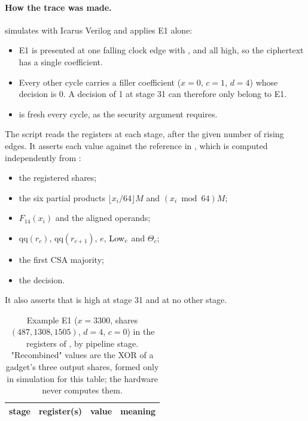 \paragraph{How the trace was made.}  simulates  with Icarus Verilog and applies E1 alone:
\begin{itemize}
  \item E1 is presented at one falling clock edge with ,  and  all high, so the ciphertext has a single coefficient.
  \item Every other cycle carries a filler coefficient ($x = 0$, $c = 1$, $d = 4$) whose decision is 0. A decision of 1 at stage 31 can therefore only belong to E1.
  \item {} is fresh every cycle, as the security argument requires.
\end{itemize}
The script reads the registers at each stage, after the given number of rising edges. It asserts each value against the reference in , which is computed independently from :
\begin{itemize}
  \item the registered shares;
  \item the six partial products $\lfloor x_i/64 \rfloor M$ and $(x_i \bmod 64) M$;
  \item $F_{14}(x_i)$ and the aligned operands;
  \item $\mathrm{qq}(r_c)$, $\mathrm{qq}(r_{c+1})$, $e$, $\mathrm{Low}_c$ and $\Theta_c$;
  \item the first CSA majority;
  \item the decision.
\end{itemize}
It also asserts that  is high at stage 31 and at no other stage.

\begin{table}[h]\centering\small
\caption{Example E1 ($x = 3300$, shares $(487, 1308, 1505)$, $d = 4$, $c = 0$) in the registers of , by pipeline stage. "Recombined" values are the XOR of a gadget's three output shares, formed only in simulation for this table; the hardware never computes them.}\label{tab:trace-e1}
\begin{tabularx}{\textwidth}{@{}rlR{6.2cm}Y@{}}
\toprule
stage & register(s) & value & meaning \\
\midrule

\end{tabularx}
\end{table}

